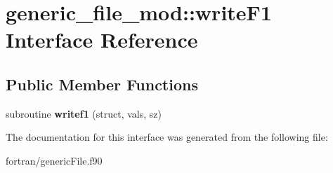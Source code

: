 \hypertarget{interfacegeneric__file__mod_1_1write_f1}{}\section{generic\+\_\+file\+\_\+mod\+:\+:write\+F1 Interface Reference}
\label{interfacegeneric__file__mod_1_1write_f1}
\subsection*{Public Member Functions}
\begin{DoxyCompactItemize}
\item 
\mbox{\label{interfacegeneric__file__mod_1_1write_f1_a1fef5ed2a0e702641be5ced5fed34469}} 
subroutine {\bfseries writef1} (struct, vals, sz)
\end{DoxyCompactItemize}


The documentation for this interface was generated from the following file\+:\begin{DoxyCompactItemize}
\item 
fortran/generic\+File.\+f90\end{DoxyCompactItemize}
